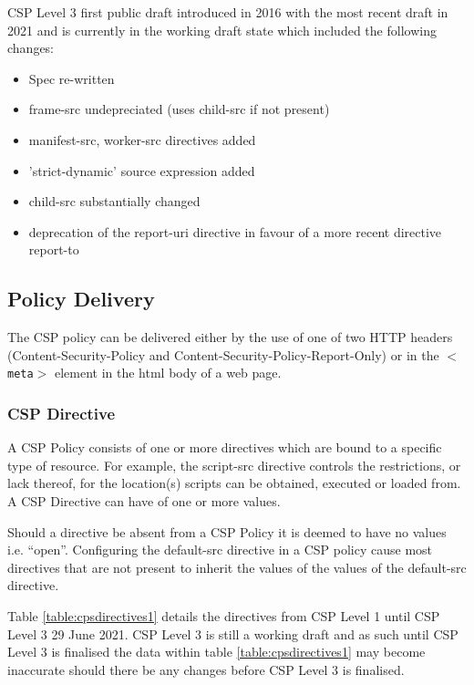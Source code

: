 \documentclass{mscreport}
\begin{document}
\vspace{0.3cm} \noindent
CSP Level 3 first public draft introduced in 2016 \cite{West2016-xj} with the most recent draft in 2021 \cite{West2021-hi} and is currently in the working draft state which included the following changes:
\begin{itemize}
  \setlength\itemsep{0.1em}
  \item Spec re-written
  \item frame-src undepreciated (uses child-src if not present)
  \item manifest-src, worker-src directives added
  \item 'strict-dynamic' source expression added
  \item child-src substantially changed
  \item deprecation of the report-uri directive in favour of a more recent directive report-to
\end{itemize}


\subsection{Policy Delivery}
The CSP policy can be delivered either by the use of one of two HTTP headers (Content-Security-Policy and Content-Security-Policy-Report-Only) or in the \texttt{$<$meta$>$} element in the html body of a web page.

\subsubsection{CSP Directive}
A CSP Policy consists of one or more directives which are bound to a specific type of resource. For example, the script-src directive controls the restrictions, or lack thereof, for the location(s) scripts can be obtained, executed or loaded from. A CSP Directive can have of one or more values.

\vspace{0.3cm} \noindent
Should a directive be absent from a CSP Policy it is deemed to have no values i.e. ``open''. Configuring the default-src directive in a CSP policy cause most directives that are not present to inherit the values of the values of the default-src directive.

\vspace{0.3cm} \noindent
Table \ref{table:cpsdirectives1} details the directives from CSP Level 1 until CSP Level 3 29 June 2021. CSP Level 3 is still a working draft and as such until CSP Level 3 is finalised the data within table \ref{table:cpsdirectives1} may become inaccurate should there be any changes before CSP Level 3 is finalised.
\end{document}
